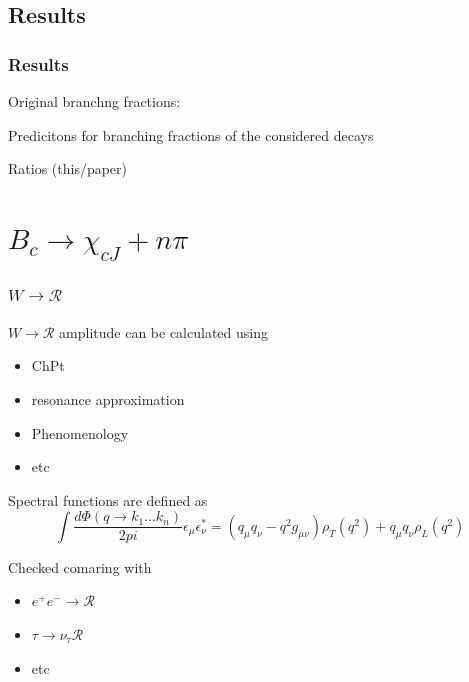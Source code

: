 \documentclass{beamer}
\newcommand{\R}{\mathcal{R}}
\begin{document}
\subsection{Results}
\begin{frame}
  \frametitle{Results}
    Original branchng fractions:
  {\tiny}
  
  Predicitons for branching fractions of the considered decays
  {\tiny}

  Ratios (this/paper)
  {\tiny}
  

\end{frame}


\section{$B_c\to \chi_{cJ}+n\pi$}
\begin{frame}
  \frametitle{$W\to \R$}
  $W\to \R$ amplitude can be calculated using
  \begin{itemize}
  \item ChPt
  \item resonance approximation
  \item Phenomenology
  \item etc
  \end{itemize}
  Spectral functions are defined as
  $$
  \int\frac{d\Phi(q \to k_1\dots k_n)}{2pi} \epsilon_\mu \epsilon^*_\nu = (q_\mu q_\nu - q^2 g_{\mu\nu}) \rho_T(q^2) + q_\mu q_\nu \rho_L(q^2)
  $$

  Checked comaring with
  \begin{itemize}
  \item $e^+ e^- \to \R$
  \item $\tau \to \nu_\tau \R$
  \item etc
  \end{itemize}
\end{frame}
\end{document}
